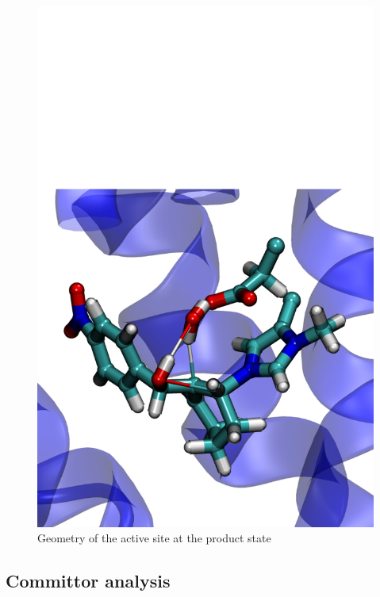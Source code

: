 \documentclass[%
preprint,
 amsmath,amssymb,
 aps,
prb,
]{revtex4-2}
\begin{document}
\begin{figure}[ht!]
\begin{minipage}[b]{.4\textwidth}
\includegraphics[scale=0.27]{figures/prod-61.pdf}
\caption{Geometry of the active site at the product state}\label{fig:prod61}
\end{minipage}
\end{figure}

\subsection{Committor analysis}
\end{document}
